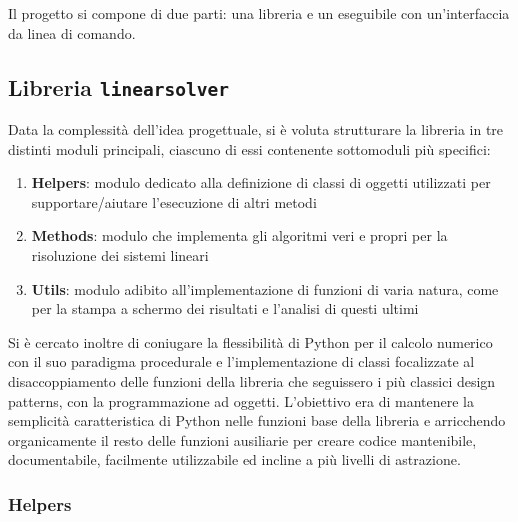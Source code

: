 \documentclass[12pt]{article}
\begin{document}
Il progetto si compone di due parti: una libreria e un eseguibile con un'interfaccia da linea di comando.

\subsection{Libreria \texttt{linearsolver}}

Data la complessità dell'idea progettuale, si è voluta strutturare la libreria in tre distinti moduli principali, ciascuno di essi contenente sottomoduli più specifici:

\begin{enumerate}
    \item \textbf{Helpers}: modulo dedicato alla definizione di classi di oggetti utilizzati per supportare/aiutare l'esecuzione di altri metodi 
    \item \textbf{Methods}: modulo che implementa gli algoritmi veri e propri per la risoluzione dei sistemi lineari
    \item \textbf{Utils}: modulo adibito all'implementazione di funzioni di varia natura, come per la stampa a schermo dei risultati e l'analisi di questi ultimi
\end{enumerate}

Si è cercato inoltre di coniugare la flessibilità di Python per il calcolo numerico con il suo paradigma procedurale e l'implementazione di classi focalizzate al disaccoppiamento delle funzioni della libreria che seguissero i più classici design patterns, con la programmazione ad oggetti. L'obiettivo era di mantenere la semplicità caratteristica di Python nelle funzioni base della libreria e arricchendo organicamente il resto delle funzioni ausiliarie per creare codice mantenibile, documentabile, facilmente utilizzabile ed incline a più livelli di astrazione.

\subsubsection{Helpers} \label{sec:helpers}
\end{document}
